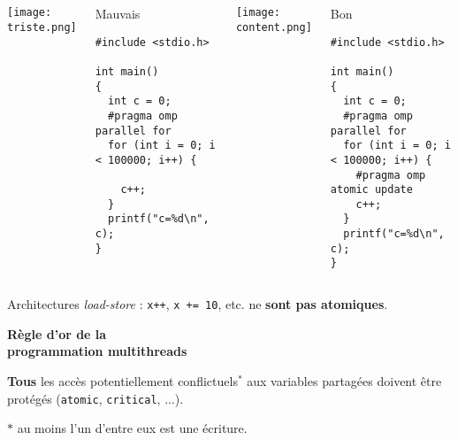 \documentclass[xcolor={x11names,svgnames},x11names,svgnames]{beamer}
\begin{document}
\begin{frame}[fragile]

  \begin{columns}[t]
  \column{5.5cm}
  \centering\texttt{[image: triste.png]}

  \begin{block}{Mauvais}
\begin{verbatim}
#include <stdio.h>
  
int main()
{
  int c = 0;
  #pragma omp parallel for
  for (int i = 0; i < 100000; i++) { 

    c++; 
  }
  printf("c=%d\n", c);
}
\end{verbatim}
\end{block}
    
    
    \column{5.5cm}
    \centering\texttt{[image: content.png]}

  \begin{block}{Bon}
\begin{verbatim}
#include <stdio.h>
  
int main()
{
  int c = 0;
  #pragma omp parallel for
  for (int i = 0; i < 100000; i++) { 
    #pragma omp atomic update
    c++; 
  }
  printf("c=%d\n", c);
}
\end{verbatim}
\end{block}
  \end{columns}

  \begin{alertblock}{Architectures \emph{load-store} :}
    \texttt{x++}, \texttt{x += 10}, etc. ne \textbf{sont pas atomiques}.
  \end{alertblock}

\end{frame}


\begin{frame}[label=golden_rule]

  \begin{center}
    \Huge \bf \alert{Règle d'or de la \\ programmation multithreads}
  \end{center}

  \bigskip
  
  {\Large \textbf{Tous} les accès potentiellement conflictuels${}^*$ aux variables partagées doivent être protégés (\texttt{atomic}, \texttt{critical}, ...).}

  \bigskip

  $*$ au moins l'un d'entre eux est une écriture.  
\end{frame}
\end{document}
